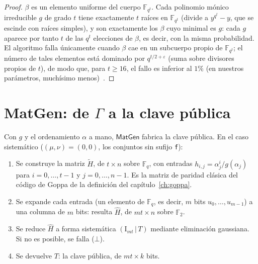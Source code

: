 \documentclass[11pt,a4paper,oneside]{report}
\newcommand{\F}{\mathbb{F}}
\newcommand{\GF}[1]{\mathbb{F}_{#1}}
\newcommand{\Ftwo}{\F_2}
\begin{document}
\begin{proof}
$\beta$ es un elemento uniforme del cuerpo $\GF{q^t}$. Cada polinomio
mónico irreducible $g$ de grado $t$ tiene exactamente $t$ raíces en
$\GF{q^t}$ (divide a $y^{q^t}-y$, que se escinde con raíces simples), y
son exactamente los $\beta$ cuyo minimal es $g$: cada $g$ aparece por
tanto $t$ de las $q^t$ elecciones de $\beta$, es decir, con la misma
probabilidad. El algoritmo falla únicamente cuando $\beta$ cae en un
subcuerpo propio de $\GF{q^t}$; el número de tales elementos está
dominado por $q^{t/2+\varepsilon}$ (suma sobre divisores propios de
$t$), de modo que, para $t\ge16$, el fallo es inferior al $1\%$ (en
nuestros parámetros, muchísimo menos)~\cite{cmrationale}.
\end{proof}

\section{\textsf{MatGen}: de $\Gamma$ a la clave pública}

Con $g$ y el ordenamiento $\alpha$ a mano, $\textsf{MatGen}$ fabrica la
clave pública. En el caso sistemático ($(\mu,\nu)=(0,0)$, los conjuntos
sin sufijo \texttt{f}):

\begin{enumerate}[leftmargin=1.8em,itemsep=2pt]
  \item Se construye la matriz $\tilde H$, de $t\times n$ sobre
        $\GF q$, con entradas $h_{i,j}=\alpha_j^i/g(\alpha_j)$ para
        $i=0,\dots,t-1$ y $j=0,\dots,n-1$. Es la matriz de paridad
        clásica del código de Goppa de la definición del
        capítulo~\ref{ch:goppa}.
  \item Se expande cada entrada (un elemento de $\GF q$, es decir, $m$
        bits $u_0,\dots,u_{m-1}$) a una columna de $m$ bits: resulta
        $\hat H$, de $mt\times n$ sobre $\Ftwo$.
  \item Se reduce $\hat H$ a forma sistemática $(\mathrm{I}_{mt}\,|\,T)$
        mediante eliminación gaussiana. Si no es posible, se falla
        ($\bot$).
  \item Se devuelve $T$: la clave pública, de $mt\times k$ bits.
\end{enumerate}
\end{document}
